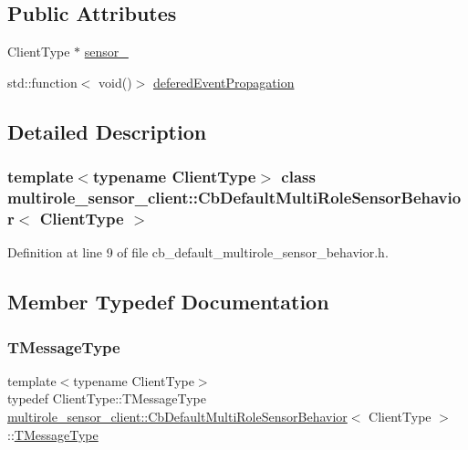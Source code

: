 \subsection*{Public Attributes}
\begin{DoxyCompactItemize}
\item 
Client\+Type $\ast$ \hyperlink{classmultirole__sensor__client_1_1CbDefaultMultiRoleSensorBehavior_a5e4e65ada73da49c2b8579b422b97d0d}{sensor\+\_\+}
\item 
std\+::function$<$ void()$>$ \hyperlink{classmultirole__sensor__client_1_1CbDefaultMultiRoleSensorBehavior_af49bfde7f78897b0e884faae69077013}{defered\+Event\+Propagation}
\end{DoxyCompactItemize}


\subsection{Detailed Description}
\subsubsection*{template$<$typename Client\+Type$>$\newline
class multirole\+\_\+sensor\+\_\+client\+::\+Cb\+Default\+Multi\+Role\+Sensor\+Behavior$<$ Client\+Type $>$}



Definition at line 9 of file cb\+\_\+default\+\_\+multirole\+\_\+sensor\+\_\+behavior.\+h.



\subsection{Member Typedef Documentation}
\mbox{\label{classmultirole__sensor__client_1_1CbDefaultMultiRoleSensorBehavior_a8343b60b6962dd8a5588d8415dd33dd9}} 
\subsubsection{\texorpdfstring{T\+Message\+Type}{TMessageType}}
{\footnotesize\ttfamily template$<$typename Client\+Type$>$ \\
typedef Client\+Type\+::\+T\+Message\+Type \hyperlink{classmultirole__sensor__client_1_1CbDefaultMultiRoleSensorBehavior}{multirole\+\_\+sensor\+\_\+client\+::\+Cb\+Default\+Multi\+Role\+Sensor\+Behavior}$<$ Client\+Type $>$\+::\hyperlink{classmultirole__sensor__client_1_1CbDefaultMultiRoleSensorBehavior_a8343b60b6962dd8a5588d8415dd33dd9}{T\+Message\+Type}}



